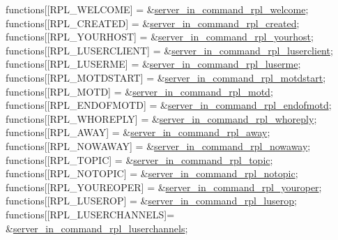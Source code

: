 \begin{DoxyCode}
functions[[RPL\_WELCOME]      = &\hyperlink{G-2313-06-P2__client__function__handlers_8h_a294ef5e5070e9859d88beb603ef950f2}{server\_in\_command\_rpl\_welcome};
functions[[RPL\_CREATED]      = &\hyperlink{G-2313-06-P2__client__function__handlers_8h_a40e46db4017fb76fc547536d9c51f5d9}{server\_in\_command\_rpl\_created};
functions[[RPL\_YOURHOST]     = &\hyperlink{G-2313-06-P2__client__function__handlers_8h_a3f4cf6c0d74b06a0916f7a9619972eee}{server\_in\_command\_rpl\_yourhost};
functions[[RPL\_LUSERCLIENT]  = &\hyperlink{G-2313-06-P2__client__function__handlers_8h_af5091cf59cbab7ce259c405c019fa8dd}{server\_in\_command\_rpl\_luserclient};
functions[[RPL\_LUSERME]      = &\hyperlink{G-2313-06-P2__client__function__handlers_8h_a5764225aa28906c7ccebf0996b2c5a08}{server\_in\_command\_rpl\_luserme};
functions[[RPL\_MOTDSTART]    = &\hyperlink{G-2313-06-P2__client__function__handlers_8h_acd688f18855dcb6ee9bf10a72e0c8f6c}{server\_in\_command\_rpl\_motdstart};
functions[[RPL\_MOTD]         = &\hyperlink{G-2313-06-P2__client__function__handlers_8h_a774c98f4ea94eb6f92a5b22d33030674}{server\_in\_command\_rpl\_motd};
functions[[RPL\_ENDOFMOTD]    = &\hyperlink{G-2313-06-P2__client__function__handlers_8h_ad22233e08c30cad9e0598f80b5b38744}{server\_in\_command\_rpl\_endofmotd};
functions[[RPL\_WHOREPLY]     = &\hyperlink{G-2313-06-P2__client__function__handlers_8h_a86782df5d9b151dd061b9831a47a2c5f}{server\_in\_command\_rpl\_whoreply};
functions[[RPL\_AWAY]         = &\hyperlink{G-2313-06-P2__client__function__handlers_8h_add282510a7e92a90d45091e6dc3a3488}{server\_in\_command\_rpl\_away};
functions[[RPL\_NOWAWAY]      = &\hyperlink{G-2313-06-P2__client__function__handlers_8h_ada377e1754f9a22a2ebe0bada8838b5b}{server\_in\_command\_rpl\_nowaway};
functions[[RPL\_TOPIC]        = &\hyperlink{G-2313-06-P2__client__function__handlers_8h_abc030e3bc9ce4ad126ea2c66e304e2d5}{server\_in\_command\_rpl\_topic};
functions[[RPL\_NOTOPIC]      = &\hyperlink{G-2313-06-P2__client__function__handlers_8h_ab9b55bd1e18bde61e8327fcf6936d91f}{server\_in\_command\_rpl\_notopic};
functions[[RPL\_YOUREOPER]    = &\hyperlink{G-2313-06-P2__client__function__handlers_8h_a24bb76a5941798964a8dd18e1cfb1d81}{server\_in\_command\_rpl\_youroper};
functions[[RPL\_LUSEROP]      = &\hyperlink{G-2313-06-P2__client__function__handlers_8h_aa885b5d729d8a920a1c38678abdbe6b7}{server\_in\_command\_rpl\_luserop};
functions[[RPL\_LUSERCHANNELS]= &\hyperlink{G-2313-06-P2__client__function__handlers_8h_ae53c29cff5b1b8b3981be92c317cf29d}{server\_in\_command\_rpl\_luserchannels};

\end{DoxyCode}
